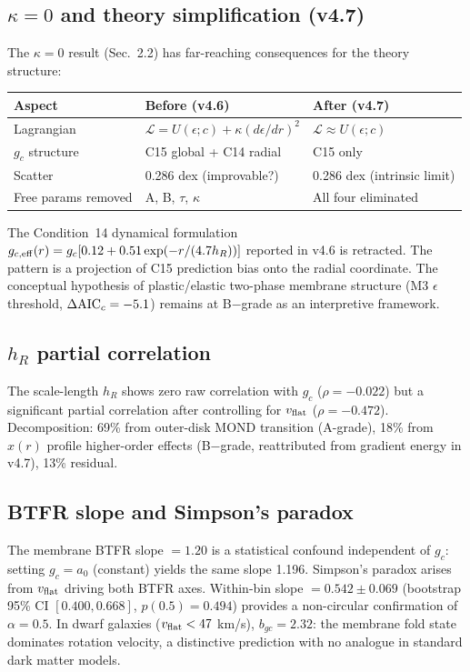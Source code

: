 \documentclass[11pt,a4paper]{article}
\newcommand{\gc}{g_{c}}
\newcommand{\ao}{a_{0}}
\newcommand{\vflat}{v_{\rm flat}}
\newcommand{\hR}{h_{R}}
\newcommand{\kap}{\kappa}
\newcommand{\AIC}{\Delta{\rm AIC}}
\begin{document}
\subsection{$\kap = 0$ and theory simplification (v4.7)}
The $\kap = 0$ result (Sec.~2.2) has far-reaching consequences for the theory structure:
\begin{center}\small
\begin{tabular}{@{}lll@{}}
\toprule
Aspect & Before (v4.6) & After (v4.7) \\
\midrule
Lagrangian & $\mathcal{L} = U(\epsilon;c) + \kap(d\epsilon/dr)^2$ & $\mathcal{L} \approx U(\epsilon;c)$ \\
$\gc$ structure & C15 global + C14 radial & C15 only \\
Scatter & 0.286 dex (improvable?) & 0.286 dex (intrinsic limit) \\
Free params removed & A, B, $\tau$, $\kap$ & All four eliminated \\
\bottomrule
\end{tabular}
\end{center}

The Condition~14 dynamical formulation $g_{c,\rm eff}(r) = \gc[0.12 + 0.51\exp(-r/(4.7\hR))]$ reported in
v4.6 is retracted. The pattern is a projection of C15 prediction bias onto the radial coordinate. The
conceptual hypothesis of plastic/elastic two-phase membrane structure (M3 $\epsilon$ threshold,
$\AIC_c = -5.1$) remains at B$-$grade as an interpretive framework.

\subsection{$\hR$ partial correlation}
The scale-length $\hR$ shows zero raw correlation with $\gc$ ($\rho = -0.022$) but a significant partial
correlation after controlling for $\vflat$ ($\rho = -0.472$). Decomposition: 69\% from outer-disk MOND
transition (A-grade), 18\% from $x(r)$ profile higher-order effects (B$-$grade, reattributed from gradient
energy in v4.7), 13\% residual.

\subsection{BTFR slope and Simpson's paradox}
The membrane BTFR slope $= 1.20$ is a statistical confound independent of $\gc$: setting $\gc = \ao$
(constant) yields the same slope 1.196. Simpson's paradox arises from $\vflat$ driving both BTFR axes.
Within-bin slope $= 0.542 \pm 0.069$ (bootstrap 95\% CI $[0.400, 0.668]$, $p(0.5) = 0.494$) provides a
non-circular confirmation of $\alpha = 0.5$. In dwarf galaxies ($\vflat < 47$ km/s), $b_{gc} = 2.32$: the
membrane fold state dominates rotation velocity, a distinctive prediction with no analogue in standard dark
matter models.
\end{document}
